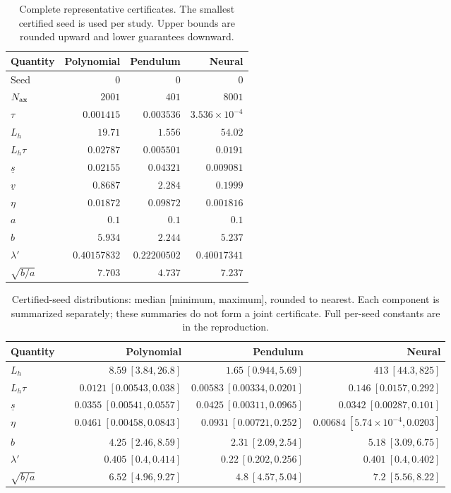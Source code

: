 \begin{table}[t]\centering\caption{Complete representative certificates. The smallest certified seed is used per study. Upper bounds are rounded upward and lower guarantees downward.}\label{tab:certconstants}
\small\begin{tabular}{lrrr}\hline Quantity & Polynomial & Pendulum & Neural\\\hline
Seed & $0$ & $0$ & $0$\\
$N_{\rm ax}$ & $2001$ & $401$ & $8001$\\
$\tau$ & $0.001415$ & $0.003536$ & $3.536 \times 10^{-4}$\\
$L_h$ & $19.71$ & $1.556$ & $54.02$\\
$L_h\tau$ & $0.02787$ & $0.005501$ & $0.0191$\\
$\underline s$ & $0.02155$ & $0.04321$ & $0.009081$\\
$\underline v$ & $0.8687$ & $2.284$ & $0.1999$\\
$\eta$ & $0.01872$ & $0.09872$ & $0.001816$\\
$a$ & $0.1$ & $0.1$ & $0.1$\\
$b$ & $5.934$ & $2.244$ & $5.237$\\
$\lambda'$ & $0.40157832$ & $0.22200502$ & $0.40017341$\\
$\sqrt{b/a}$ & $7.703$ & $4.737$ & $7.237$\\
\hline\end{tabular}\end{table}
\begin{table}[t]\centering\caption{Certified-seed distributions: median [minimum, maximum], rounded to nearest. Each component is summarized separately; these summaries do not form a joint certificate. Full per-seed constants are in the reproduction.}\label{tab:certsummaries}
\scriptsize\begin{tabular}{llrrr}\hline Quantity & & Polynomial & Pendulum & Neural\\\hline
$L_h$ & & $8.59\ [3.84, 26.8]$ & $1.65\ [0.944, 5.69]$ & $413\ [44.3, 825]$\\
$L_h\tau$ & & $0.0121\ [0.00543, 0.038]$ & $0.00583\ [0.00334, 0.0201]$ & $0.146\ [0.0157, 0.292]$\\
$\underline s$ & & $0.0355\ [0.00541, 0.0557]$ & $0.0425\ [0.00311, 0.0965]$ & $0.0342\ [0.00287, 0.101]$\\
$\eta$ & & $0.0461\ [0.00458, 0.0843]$ & $0.0931\ [0.00721, 0.252]$ & $0.00684\ [5.74 \times 10^{-4}, 0.0203]$\\
$b$ & & $4.25\ [2.46, 8.59]$ & $2.31\ [2.09, 2.54]$ & $5.18\ [3.09, 6.75]$\\
$\lambda'$ & & $0.405\ [0.4, 0.414]$ & $0.22\ [0.202, 0.256]$ & $0.401\ [0.4, 0.402]$\\
$\sqrt{b/a}$ & & $6.52\ [4.96, 9.27]$ & $4.8\ [4.57, 5.04]$ & $7.2\ [5.56, 8.22]$\\
\hline\end{tabular}\end{table}
